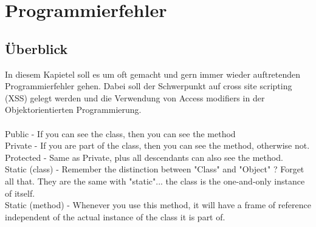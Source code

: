 \section{Programmierfehler}\label{programmierfehler}

\subsection*{Überblick}\label{ueberblick}
In diesem Kapietel soll es um oft gemacht und gern immer wieder auftretenden Programmierfehler gehen.
Dabei soll der Schwerpunkt auf cross site scripting (XSS) gelegt werden und die Verwendung von Access modifiers in der Objektorientierten Programmierung.
\\\\
Public - If you can see the class, then you can see the method
\\
Private - If you are part of the class, then you can see the method, otherwise not.
\\
Protected - Same as Private, plus all descendants can also see the method.
\\
Static (class) - Remember the distinction between "Class" and "Object" ? Forget all that. They are the same with "static"... the class is the one-and-only instance of itself.
\\
Static (method) - Whenever you use this method, it will have a frame of reference independent of the actual instance of the class it is part of.
